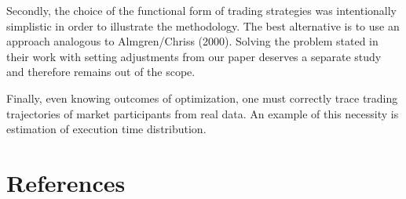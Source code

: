 \documentclass[12pt]{article}
\begin{document}
Secondly, the choice of the functional form of trading strategies was intentionally simplistic in order to illustrate the methodology. The best alternative is to use an approach analogous to Almgren/Chriss (2000). Solving the problem stated in their work with setting adjustments from our paper deserves a separate study and therefore remains out of the scope.

Finally, even knowing outcomes of optimization, one must correctly trace trading trajectories of market participants from real data. An example of this necessity is estimation of execution time distribution. 
\newpage
\section{References}\label{sec:ref}
\printbibliography
\newpage

\appendix
\end{document}
